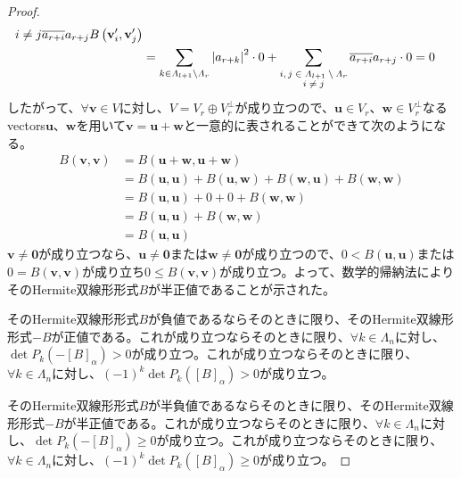 \documentclass[dvipdfmx]{jsarticle}
\begin{document}
\begin{proof}
\begin{align*}
{\begin{matrix}
i \neq j \\\end{matrix}} {\overline{a_{r + i}}a_{r + j}B\left( \mathbf{v}_{i}',\mathbf{v}_{j}' \right)}\\
&= \sum_{k \in \varLambda_{l + 1} \setminus \varLambda_{r}} {\left| a_{r + k} \right|^{2} \cdot 0} + \sum_{\scriptsize \begin{matrix}i,j \in \varLambda_{l + 1} \setminus \varLambda_{r} \\
i \neq j \\\end{matrix}} {\overline{a_{r + i}}a_{r + j} \cdot 0} = 0
\end{align*}
したがって、$\forall\mathbf{v} \in V$に対し、$V = V_{r} \oplus V_{r}^{\bot}$が成り立つので、$\mathbf{u} \in V_{r}$、$\mathbf{w} \in V_{r}^{\bot}$なるvectors$\mathbf{u}$、$\mathbf{w}$を用いて$\mathbf{v} = \mathbf{u} + \mathbf{w}$と一意的に表されることができて次のようになる。
\begin{align*}
B\left( \mathbf{v},\mathbf{v} \right) &= B\left( \mathbf{u} + \mathbf{w},\mathbf{u} + \mathbf{w} \right)\\
&= B\left( \mathbf{u},\mathbf{u} \right) + B\left( \mathbf{u},\mathbf{w} \right) + B\left( \mathbf{w},\mathbf{u} \right) + B\left( \mathbf{w},\mathbf{w} \right)\\
&= B\left( \mathbf{u},\mathbf{u} \right) + 0 + 0 + B\left( \mathbf{w},\mathbf{w} \right)\\
&= B\left( \mathbf{u},\mathbf{u} \right) + B\left( \mathbf{w},\mathbf{w} \right)\\
&= B\left( \mathbf{u},\mathbf{u} \right)
\end{align*}
$\mathbf{v} \neq \mathbf{0}$が成り立つなら、$\mathbf{u} \neq \mathbf{0}$または$\mathbf{w} \neq \mathbf{0}$が成り立つので、$0 < B\left( \mathbf{u},\mathbf{u} \right)$または$0 = B\left( \mathbf{v},\mathbf{v} \right)$が成り立ち$0 \leq B\left( \mathbf{v},\mathbf{v} \right)$が成り立つ。よって、数学的帰納法によりそのHermite双線形形式$B$が半正値であることが示された。\par
そのHermite双線形形式$B$が負値であるならそのときに限り、そのHermite双線形形式$- B$が正値である。これが成り立つならそのときに限り、$\forall k \in \varLambda_{n}$に対し、$\det{P_{k}\left( - [ B]_{\alpha} \right)} > 0$が成り立つ。これが成り立つならそのときに限り、$\forall k \in \varLambda_{n}$に対し、$( - 1)^{k}\det{P_{k}\left( [ B]_{\alpha} \right)} > 0$が成り立つ。\par
そのHermite双線形形式$B$が半負値であるならそのときに限り、そのHermite双線形形式$- B$が半正値である。これが成り立つならそのときに限り、$\forall k \in \varLambda_{n}$に対し、$\det{P_{k}\left( - [ B]_{\alpha} \right)} \geq 0$が成り立つ。これが成り立つならそのときに限り、$\forall k \in \varLambda_{n}$に対し、$( - 1)^{k}\det{P_{k}\left( [ B]_{\alpha} \right)} \geq 0$が成り立つ。
\end{proof}
\end{document}
